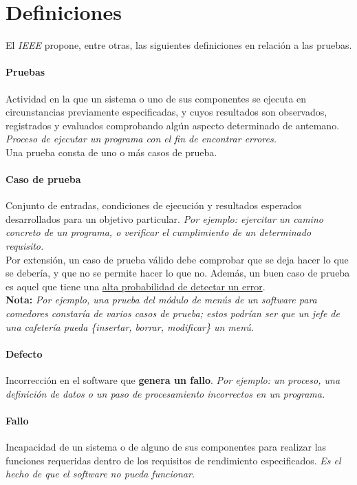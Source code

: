 \section{Definiciones}

El \textit{IEEE} propone, entre otras, las siguientes definiciones en relación a las pruebas.

\paragraph{Pruebas} Actividad en la que un sistema o uno de sus componentes se ejecuta en circunstancias previamente especificadas, y cuyos resultados son observados, registrados y evaluados comprobando algún aspecto determinado de antemano. \textit{Proceso de ejecutar un programa con el fin de encontrar errores.}\\

Una prueba consta de uno o más casos de prueba.

\paragraph{Caso de prueba} Conjunto de entradas, condiciones de ejecución y resultados esperados desarrollados para un objetivo particular. \textit{Por ejemplo: ejercitar un camino concreto de un programa, o verificar el cumplimiento de un determinado requisito.}\\

Por extensión, un caso de prueba válido debe comprobar que se deja hacer lo que se debería, y que no se permite hacer lo que no. Además, un buen caso de prueba es aquel que tiene una \uline{alta probabilidad de detectar un error}.\\

\textbf{Nota:} \textit{Por ejemplo, una prueba del módulo de menús de un software para comedores constaría de varios casos de prueba; estos podrían ser que un jefe de una cafetería pueda \{insertar, borrar, modificar\} un menú.}

\paragraph{Defecto} Incorrección en el software que \textbf{genera un fallo}. \textit{Por ejemplo: un proceso, una definición de datos o un paso de procesamiento incorrectos en un programa.}

\paragraph{Fallo} Incapacidad de un sistema o de alguno de sus componentes para realizar las funciones requeridas dentro de los requisitos de rendimiento especificados. \textit{Es el hecho de que el software no pueda funcionar.}\\


